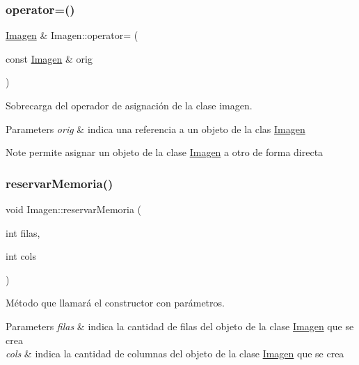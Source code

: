 \subsubsection{\texorpdfstring{operator=()}{operator=()}}
{\footnotesize\ttfamily \hyperlink{classImagen}{Imagen} \& Imagen\+::operator= (\begin{DoxyParamCaption}\item[{const \hyperlink{classImagen}{Imagen} \&}]{orig }\end{DoxyParamCaption})}



Sobrecarga del operador de asignación de la clase imagen. 


\begin{DoxyParams}{Parameters}
{\em orig} & indica una referencia a un objeto de la clas \hyperlink{classImagen}{Imagen} \\
\hline
\end{DoxyParams}
\begin{DoxyNote}{Note}
permite asignar un objeto de la clase \hyperlink{classImagen}{Imagen} a otro de forma directa 
\end{DoxyNote}
\mbox{\label{classImagen_a37461202648dcc0544547e6d19b19db0}} 
\subsubsection{\texorpdfstring{reservar\+Memoria()}{reservarMemoria()}}
{\footnotesize\ttfamily void Imagen\+::reservar\+Memoria (\begin{DoxyParamCaption}\item[{int}]{filas,  }\item[{int}]{cols }\end{DoxyParamCaption})}



Método que llamará el constructor con parámetros. 


\begin{DoxyParams}{Parameters}
{\em filas} & indica la cantidad de filas del objeto de la clase \hyperlink{classImagen}{Imagen} que se crea \\
\hline
{\em cols} & indica la cantidad de columnas del objeto de la clase \hyperlink{classImagen}{Imagen} que se crea \\
\hline
\end{DoxyParams}
\mbox{\label{classImagen_a5ec143dabc92d00ef71f1831ae15b66a}} 
